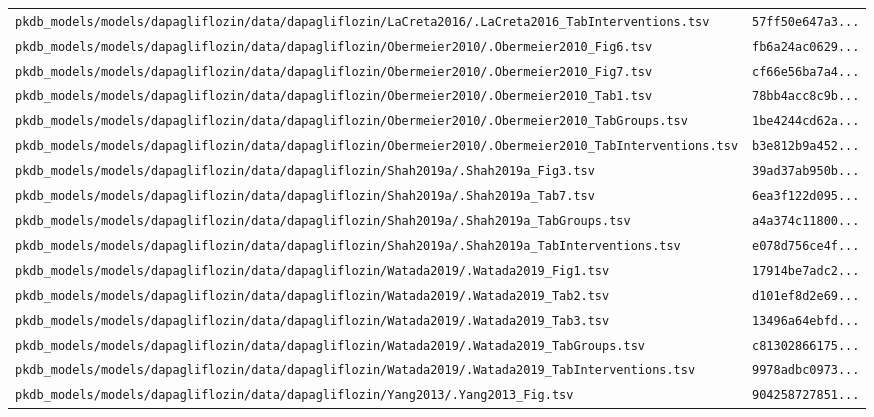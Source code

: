 \begin{longtable}{ll}
\texttt{pkdb\_models/models/dapagliflozin/data/dapagliflozin/LaCreta2016/.LaCreta2016\_TabInterventions.tsv} & \texttt{57ff50e647a3...} \\
\texttt{pkdb\_models/models/dapagliflozin/data/dapagliflozin/Obermeier2010/.Obermeier2010\_Fig6.tsv} & \texttt{fb6a24ac0629...} \\
\texttt{pkdb\_models/models/dapagliflozin/data/dapagliflozin/Obermeier2010/.Obermeier2010\_Fig7.tsv} & \texttt{cf66e56ba7a4...} \\
\texttt{pkdb\_models/models/dapagliflozin/data/dapagliflozin/Obermeier2010/.Obermeier2010\_Tab1.tsv} & \texttt{78bb4acc8c9b...} \\
\texttt{pkdb\_models/models/dapagliflozin/data/dapagliflozin/Obermeier2010/.Obermeier2010\_TabGroups.tsv} & \texttt{1be4244cd62a...} \\
\texttt{pkdb\_models/models/dapagliflozin/data/dapagliflozin/Obermeier2010/.Obermeier2010\_TabInterventions.tsv} & \texttt{b3e812b9a452...} \\
\texttt{pkdb\_models/models/dapagliflozin/data/dapagliflozin/Shah2019a/.Shah2019a\_Fig3.tsv} & \texttt{39ad37ab950b...} \\
\texttt{pkdb\_models/models/dapagliflozin/data/dapagliflozin/Shah2019a/.Shah2019a\_Tab7.tsv} & \texttt{6ea3f122d095...} \\
\texttt{pkdb\_models/models/dapagliflozin/data/dapagliflozin/Shah2019a/.Shah2019a\_TabGroups.tsv} & \texttt{a4a374c11800...} \\
\texttt{pkdb\_models/models/dapagliflozin/data/dapagliflozin/Shah2019a/.Shah2019a\_TabInterventions.tsv} & \texttt{e078d756ce4f...} \\
\texttt{pkdb\_models/models/dapagliflozin/data/dapagliflozin/Watada2019/.Watada2019\_Fig1.tsv} & \texttt{17914be7adc2...} \\
\texttt{pkdb\_models/models/dapagliflozin/data/dapagliflozin/Watada2019/.Watada2019\_Tab2.tsv} & \texttt{d101ef8d2e69...} \\
\texttt{pkdb\_models/models/dapagliflozin/data/dapagliflozin/Watada2019/.Watada2019\_Tab3.tsv} & \texttt{13496a64ebfd...} \\
\texttt{pkdb\_models/models/dapagliflozin/data/dapagliflozin/Watada2019/.Watada2019\_TabGroups.tsv} & \texttt{c81302866175...} \\
\texttt{pkdb\_models/models/dapagliflozin/data/dapagliflozin/Watada2019/.Watada2019\_TabInterventions.tsv} & \texttt{9978adbc0973...} \\
\texttt{pkdb\_models/models/dapagliflozin/data/dapagliflozin/Yang2013/.Yang2013\_Fig.tsv} & \texttt{904258727851...} \\

\end{longtable}
